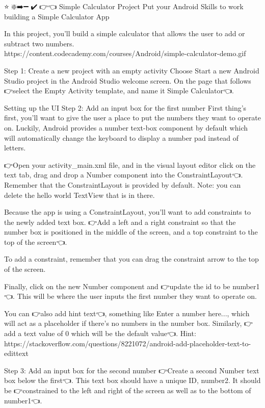 ⭐🎨❇️➡️➖💎✔️🔗👉👈
Simple Calculator Project
        Put your Android Skills to work building a Simple Calculator App

        In this project, you’ll build a simple calculator that allows the user to add or subtract two numbers.
            🎨https://content.codecademy.com/courses/Android/simple-calculator-demo.gif

    Step 1: Create a new project with an empty activity
        Choose Start a new Android Studio project in the Android Studio welcome screen. On the page that follows 👉select the Empty Activity template, and name it Simple Calculator👈.

Setting up the UI
    Step 2: Add an input box for the first number
        First thing’s first, you’ll want to give the user a place to put the numbers they want to operate on. Luckily, Android provides a number text-box component by default which will automatically change the keyboard to display a number pad instead of letters.

        👉Open your activity_main.xml file, and in the visual layout editor click on the text tab, drag and drop a Number component into the ConstraintLayout👈. Remember that the ConstraintLayout is provided by default. Note: you can delete the hello world TextView that is in there.

        Because the app is using a ConstraintLayout, you’ll want to add constraints to the newly added text box. 👉Add a left and a right constraint so that the number box is positioned in the middle of the screen, and a top constraint to the top of the screen👈.

        To add a constraint, remember that you can drag the constraint arrow to the top of the screen.

        Finally, click on the new Number component and 👉update the id to be number1👈. This will be where the user inputs the first number they want to operate on.

        You can 👉also add hint text👈, something like Enter a number here..., which will act as a placeholder if there’s no numbers in the number box. Similarly, 👉add a text value of 0 which will be the default value👈.
            Hint: https://stackoverflow.com/questions/8221072/android-add-placeholder-text-to-edittext

    Step 3: Add an input box for the second number
        👉Create a second Number text box below the first👈. This text box should have a unique ID, number2. It should be 👉constrained to the left and right of the screen as well as to the bottom of number1👈.

